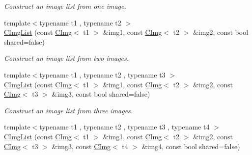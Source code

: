 \begin{DoxyCompactItemize}
\begin{DoxyCompactList}\small\item\em Construct an image list from one image. \item\end{DoxyCompactList}\item 
\hypertarget{structcimg__library_1_1CImgList_a0469864139d8c1d27da3c686ce1e3d57}{
{\footnotesize template$<$typename t1 , typename t2 $>$ }\\\hyperlink{structcimg__library_1_1CImgList_a0469864139d8c1d27da3c686ce1e3d57}{CImgList} (const \hyperlink{structcimg__library_1_1CImg}{CImg}$<$ t1 $>$ \&img1, const \hyperlink{structcimg__library_1_1CImg}{CImg}$<$ t2 $>$ \&img2, const bool shared=false)}
\label{structcimg__library_1_1CImgList_a0469864139d8c1d27da3c686ce1e3d57}

\begin{DoxyCompactList}\small\item\em Construct an image list from two images. \item\end{DoxyCompactList}\item 
\hypertarget{structcimg__library_1_1CImgList_a44bc8a6bb88dd8e77d4f941d4c432784}{
{\footnotesize template$<$typename t1 , typename t2 , typename t3 $>$ }\\\hyperlink{structcimg__library_1_1CImgList_a44bc8a6bb88dd8e77d4f941d4c432784}{CImgList} (const \hyperlink{structcimg__library_1_1CImg}{CImg}$<$ t1 $>$ \&img1, const \hyperlink{structcimg__library_1_1CImg}{CImg}$<$ t2 $>$ \&img2, const \hyperlink{structcimg__library_1_1CImg}{CImg}$<$ t3 $>$ \&img3, const bool shared=false)}
\label{structcimg__library_1_1CImgList_a44bc8a6bb88dd8e77d4f941d4c432784}

\begin{DoxyCompactList}\small\item\em Construct an image list from three images. \item\end{DoxyCompactList}\item 
\hypertarget{structcimg__library_1_1CImgList_a8bc14ca08857667fecd5f6139936e9c8}{
{\footnotesize template$<$typename t1 , typename t2 , typename t3 , typename t4 $>$ }\\\hyperlink{structcimg__library_1_1CImgList_a8bc14ca08857667fecd5f6139936e9c8}{CImgList} (const \hyperlink{structcimg__library_1_1CImg}{CImg}$<$ t1 $>$ \&img1, const \hyperlink{structcimg__library_1_1CImg}{CImg}$<$ t2 $>$ \&img2, const \hyperlink{structcimg__library_1_1CImg}{CImg}$<$ t3 $>$ \&img3, const \hyperlink{structcimg__library_1_1CImg}{CImg}$<$ t4 $>$ \&img4, const bool shared=false)}
\label{structcimg__library_1_1CImgList_a8bc14ca08857667fecd5f6139936e9c8}


\end{DoxyCompactItemize}
